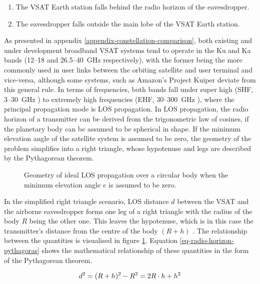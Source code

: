 \documentclass[english, 12pt, a4paper, elec, utf8, a-1b, online]{aaltothesis}
\begin{document}
\begin{enumerate}
  \item The VSAT Earth station falls behind the radio horizon of the eavesdropper.
  \item The eavesdropper falls outside the main lobe of the VSAT Earth station. %
\end{enumerate}

As presented in appendix \ref{appendix-constellation-comparison}, both existing and under development broadband VSAT systems tend to operate in the Ku and Ka bands (12--18 and 26.5--\SI{40}{\giga\hertz} respectively), with the former being the more commonly used in user links between the orbiting satellite and user terminal and vice-versa, although some systems, such as Amazon's Project Kuiper deviate from this general rule.
In terms of frequencies, both bands fall under super high (SHF, 3--\SI{30}{\giga\hertz} ) to extremely high frequencies (EHF, 30--\SI{300}{\giga\hertz} ), where the principal propagation mode is LOS propagation.
In LOS propagation, the radio horizon of a transmitter can be derived from the trigonometric law of cosines, if the planetary body can be assumed to be spherical in shape. If the minimum elevation angle of the satellite system is assumed to be zero, the geometry of the problem simplifies into a right triangle, whose hypotenuse and legs are described by the Pythagorean theorem.

\begin{figure}[h]
  \centering
  
  \caption{Geometry of ideal LOS propagation over a circular body \cite{seybold2005introduction} when the minimum elevation angle $e$ is assumed to be zero.}
  \label{fig-interception-range-vacuum}
\end{figure}

In the simplified right triangle scenario, LOS distance $d$ between the VSAT and the airborne eavesdropper forms one leg of a right triangle with the radius of the body $R$ being the other one. This leaves the hypotenuse, which is in this case the transmitter's distance from the centre of the body $(R+h)$ \cite{seybold2005introduction}.
The relationship between the quantities is visualised in figure \ref{fig-interception-range-vacuum}. Equation \ref{eq-radio-horizon-pythagoras} shows the mathematical relationship of these quantities in the form of the Pythagorean theorem.

\begin{equation} \label{eq-radio-horizon-pythagoras}
  d^2=(R+h)^{2}-R^2= 2R \cdot h + h^2 \\
\end{equation}
\end{document}
